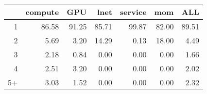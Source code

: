 \documentclass{article}
\begin{document}
\begin{table}[ht]
\centering
\begin{tabular}{rrrrrrr}
  \hline
 & compute & GPU & lnet & service & mom & ALL \\
  \hline
1 & 86.58 & 91.25 & 85.71 & 99.87 & 82.00 & 89.51 \\
  2 & 5.69 & 3.20 & 14.29 & 0.13 & 18.00 & 4.49 \\
  3 & 2.18 & 0.84 & 0.00 & 0.00 & 0.00 & 1.66 \\
  4 & 2.51 & 3.20 & 0.00 & 0.00 & 0.00 & 2.02 \\
  5+ & 3.03 & 1.52 & 0.00 & 0.00 & 0.00 & 2.32 \\
   \hline
\end{tabular}
\end{table}
\thispagestyle{empty}
\end{document}

